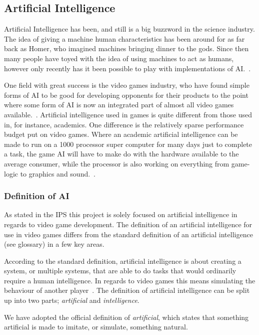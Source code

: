 

\subsection{Artificial Intelligence} \label{sec:ai}
Artificial Intelligence has been, and still is a big buzzword in the science industry.
The idea of giving a machine human characteristics has been around for as far back as Homer, who imagined machines bringing dinner to the gods. Since then many people have toyed with the idea of using machines to act as humans, however only recently has it been possible to play with implementations of AI.~\autocite{Buchanan2006}.

One field with great success is the video games industry, who have found simple forms of AI to be good for developing opponents for their products to the point where some form of AI is now an integrated part of almost all video games available.~\autocite{Microsoft2014}.
Artificial intelligence used in games is quite different from those used in, for instance, academics.
One difference is the relatively sparse performance budget put on video games.
Where an academic artificial intelligence can be made to run on a 1000 processor super computer for many days just to complete a task, the game AI will have to make do with the hardware available to the average consumer, while the processor is also working on everything from game-logic to graphics and sound.~\autocite{Buckland2005}.

\subsubsection{Definition of AI}
As stated in the IPS this project is solely focused on artificial intelligence in regards to video game development.
The definition of an artificial intelligence for use in video games differs from the standard definition of an artificial intelligence (see glossary) in a few key areas.

According to the standard definition, artificial intelligence is about creating a system, or multiple systems, that are able to do tasks that would ordinarily require a human intelligence. In regards to video games this means simulating the behaviour of another player~\autocite{Kehoe2009}.
The definition of artificial intelligence can be split up into two parts; \emph{artificial} and \emph{intelligence}.

We have adopted the official definition of \emph{artificial}\autocite{artificial2014}, which states that something artificial is made to imitate, or simulate, something natural.


